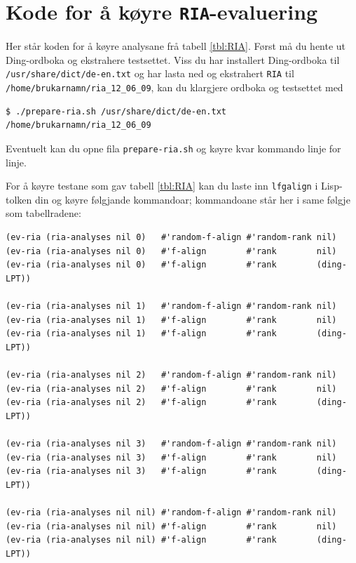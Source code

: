 \documentclass[12pt,a4paper,oneside,draft]{report}
\begin{document}



\appendix

\chapter{Kode for å køyre \texttt{RIA}-evaluering}
\label{sec-7}

\label{SEC:ria-kode}

Her står koden for å køyre analysane frå tabell \ref{tbl:RIA}. Først
 må du hente ut Ding-ordboka og ekstrahere testsettet. Viss du har
 installert Ding-ordboka til \texttt{/usr/share/dict/de-en.txt} og har lasta
 ned og ekstrahert \texttt{RIA} til \texttt{/home/brukarnamn/ria\_12\_06\_09}, kan du
 klargjere ordboka og testsettet med


\begin{verbatim}
$ ./prepare-ria.sh /usr/share/dict/de-en.txt /home/brukarnamn/ria_12_06_09
\end{verbatim}



Eventuelt kan du opne fila \texttt{prepare-ria.sh} og køyre kvar kommando
 linje for linje.

For å køyre testane som gav tabell \ref{tbl:RIA} kan du laste inn
 \texttt{lfgalign} i Lisp-tolken din og køyre følgjande kommandoar;
 kommandoane står her i same følgje som tabellradene:


\begin{verbatim}
(ev-ria (ria-analyses nil 0)   #'random-f-align #'random-rank nil)
(ev-ria (ria-analyses nil 0)   #'f-align        #'rank        nil)
(ev-ria (ria-analyses nil 0)   #'f-align        #'rank        (ding-LPT))

(ev-ria (ria-analyses nil 1)   #'random-f-align #'random-rank nil)
(ev-ria (ria-analyses nil 1)   #'f-align        #'rank        nil)
(ev-ria (ria-analyses nil 1)   #'f-align        #'rank        (ding-LPT))

(ev-ria (ria-analyses nil 2)   #'random-f-align #'random-rank nil)
(ev-ria (ria-analyses nil 2)   #'f-align        #'rank        nil)
(ev-ria (ria-analyses nil 2)   #'f-align        #'rank        (ding-LPT))

(ev-ria (ria-analyses nil 3)   #'random-f-align #'random-rank nil)
(ev-ria (ria-analyses nil 3)   #'f-align        #'rank        nil)
(ev-ria (ria-analyses nil 3)   #'f-align        #'rank        (ding-LPT))

(ev-ria (ria-analyses nil nil) #'random-f-align #'random-rank nil)
(ev-ria (ria-analyses nil nil) #'f-align        #'rank        nil)
(ev-ria (ria-analyses nil nil) #'f-align        #'rank        (ding-LPT))
\end{verbatim}
\end{document}
